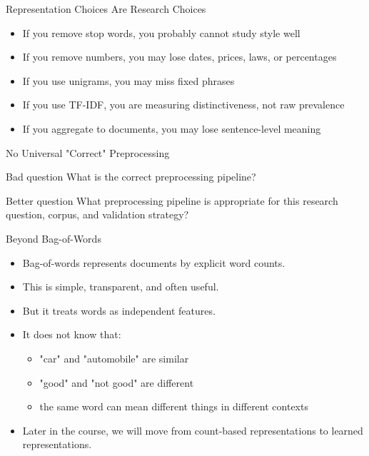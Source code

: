 \documentclass[11pt,aspectratio=43]{beamer}
\begin{document}
\begin{frame}{Representation Choices Are Research Choices}
\begin{itemize}
\item If you remove stop words, you probably cannot study style well
\item If you remove numbers, you may lose dates, prices, laws, or percentages
\item If you use unigrams, you may miss fixed phrases
\item If you use TF-IDF, you are measuring distinctiveness, not raw prevalence
\item If you aggregate to documents, you may lose sentence-level meaning
\end{itemize}
\end{frame}

\begin{frame}{No Universal "Correct" Preprocessing}
\begin{block}{Bad question}
What is the correct preprocessing pipeline?
\end{block}
\vspace{1.5em}
\begin{block}{Better question}
What preprocessing pipeline is appropriate for this research question, corpus, and validation strategy?
\end{block}
\end{frame}

\begin{frame}{Beyond Bag-of-Words}
\begin{itemize}
\item Bag-of-words represents documents by explicit word counts.
\item This is simple, transparent, and often useful.
\item But it treats words as independent features.
\item It does not know that:
  \begin{itemize}
  \item "car" and "automobile" are similar
  \item "good" and "not good" are different
  \item the same word can mean different things in different contexts
  \end{itemize}
\item Later in the course, we will move from count-based representations to learned representations.
\end{itemize}
\end{frame}
\end{document}
